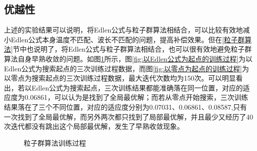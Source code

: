 \subsection{优越性}
上述的实验结果可以说明，将Edlen公式与粒子群算法相结合，可以比较有效地减小Edlen公式本身温度不匹配、波长不匹配的问题，提高补偿效果。但在\ref{粒子群算法}节中也说明了，将Edlen公式与粒子群算法相结合，也可以很有效地避免粒子群算法自身早熟收敛的问题。如图\ref{fig:粒子群算法训练过程}所示，图\ref{fig:以Edlen公式为起点的训练过程}为以Edlen公式为搜索起点的三次训练过程数据，而图\ref{fig:以零点为起点的训练过程}为以零点为搜索起点的三次训练过程数据，最大迭代次数均为150次。可以明显看出，若以Edlen公式为搜索起点，三次训练结果都能准确落在同一位置，对应的适应度为0.06861，可以认为是找到了全局最优解；而若从零点开始搜索，三次训练结果落在了三个不同位置，对应的适应度分别为0.07031、0.06861、0.08587,只有一次找到了全局最优解，而另外两次都只找到了局部最优解，并且最少又经历了40次迭代都没有跳出这个局部最优解，发生了早熟收敛现象。

\begin{figure}[htb]
  \centering
  \caption{粒子群算法训练过程}
  \label{fig:粒子群算法训练过程}
\end{figure}

